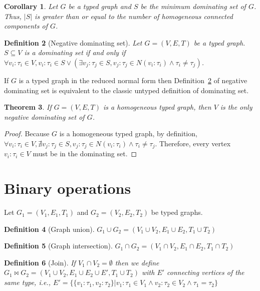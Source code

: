 \documentclass[preprint,12pt]{elsarticle}
\theoremstyle{plain}
\newtheorem{theorem}{Theorem}[section]
\newtheorem{corollary}[theorem]{Corollary}
\newtheorem{definition}[theorem]{Definition}
\newcommand\tyv[2]{#1\!\!:\!\!#2}
\begin{document}
\begin{corollary}
Let $G$ be a typed graph
and $S$ be the minimum dominating set of $G$.
Thus, $|S|$ is greater than or equal to the number of 
homogeneous connected components of $G$.
\end{corollary}

\begin{definition}[Negative dominating set]\label{def:neg-dom-set}
Let $G = (V,E,T)$ be a typed graph.
$S\subseteq V$ is a dominating set
if and only if
$\forall \tyv{v_i}{\tau_i}\in V, \tyv{v_i}{\tau_i}\in S \vee
 (
   \exists \tyv{v_j}{\tau_j}\in S, \tyv{v_j}{\tau_j}\in N(\tyv{v_i}{\tau_i})
   \wedge \tau_i\neq\tau_j
 )
$.
\end{definition}

If $G$ is a typed graph in the reduced normal form
then Definition~\ref{def:neg-dom-set}
of negative dominating set is equivalent 
to the classic untyped definition
of dominating set.

\begin{theorem}
If $G = (V,E,T)$ is a homogeneous typed graph,
then $V$ is the only negative dominating set of $G$.
\end{theorem}
\begin{proof}
Because $G$ is a homogeneous typed graph, by definition,
$\forall \tyv{v_i}{\tau_i}\in V,
\nexists \tyv{v_j}{\tau_j}\in S, \tyv{v_j}{\tau_j}\in N(\tyv{v_i}{\tau_i})
   \wedge \tau_i\neq\tau_j$.
Therefore, every vertex $\tyv{v_i}{\tau_i}\in V$ must be in the dominating set.
\end{proof}

\section{Binary operations}

Let $G_1 = (V_1,E_1,T_1)$ and $G_2 = (V_2,E_2,T_2)$
be typed graphs.

\begin{definition}[Graph union]
$G_1\cup G_2 = (V_1\cup V_2, E_1\cup E_2, T_1\cup T_2)$
\end{definition}

\begin{definition}[Graph intersection]
$G_1\cap G_2 = (V_1\cap V_2, E_1\cap E_2, T_1\cap T_2)$
\end{definition}

\begin{definition}[Join]
If $V_1\cap V_2=\emptyset$ then we define
$G_1\Join G_2 = (V_1\cup V_2, E_1\cup E_2\cup E', T_1\cup T_2)$
with $E'$ connecting vertices of the same type, i.e.,
$E' = \{\{\tyv{v_1}{\tau_1}, \tyv{v_2}{\tau_2}\}|\tyv{v_1}{\tau_1}\in V_1\wedge\tyv{v_2}{\tau_2}\in V_2\wedge \tau_1=\tau_2\}$
\end{definition}
\end{document}
